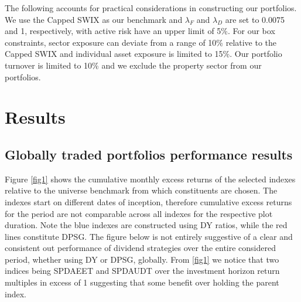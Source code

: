 \documentclass[11pt,preprint, authoryear]{elsarticle}
\numberwithin{equation}{section}
\numberwithin{figure}{section}
\numberwithin{table}{section}
\begin{document}
The following accounts for practical considerations in constructing our
portfolios. We use the Capped SWIX as our benchmark and \(\lambda_F\)
and \(\lambda_D\) are set to 0.0075 and 1, respectively, with active
risk have an upper limit of 5\%. For our box constraints, sector
exposure can deviate from a range of 10\% relative to the Capped SWIX
and individual asset exposure is limited to 15\%. Our portfolio turnover
is limited to 10\% and we exclude the property sector from our
portfolios. \newpage

\hypertarget{results}{%
\section*{Results}\label{results}}

\hypertarget{globally-traded-portfolios-performance-results}{%
\subsection{Globally traded portfolios performance
results}\label{globally-traded-portfolios-performance-results}}

Figure \ref{fig1} shows the cumulative monthly excess returns of the
selected indexes relative to the universe benchmark from which
constituents are chosen. The indexes start on different dates of
inception, therefore cumulative excess returns for the period are not
comparable across all indexes for the respective plot duration. Note the
blue indexes are constructed using DY ratios, while the red lines
constitute DPSG. The figure below is not entirely suggestive of a clear
and consistent out performance of dividend strategies over the entire
considered period, whether using DY or DPSG, globally. From \ref{fig1}
we notice that two indices being SPDAEET and SPDAUDT over the investment
horizon return multiples in excess of 1 suggesting that some benefit
over holding the parent index.
\end{document}
